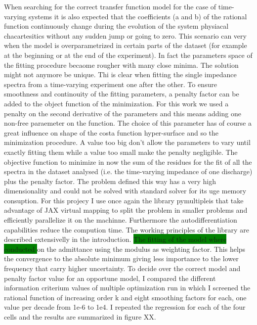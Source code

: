 When searching for the correct transfer function model for the case of time-varying systems it is also expected that the coefficients (a and b) of the rational function continuously change during the evolution of the system physiacal chacartesitics without any sudden jump or going to zero. This scenario can very when the model is overparametrized in certain parts of the dataset (for example at the beginning or at the end of the experiment). In fact the parameters space of the fitting procedure becaome rougher with many close minima. The solution might not anymore be unique. Thi is clear when fitting the single impedance spectra from a time-varying experiment one after the other. To ensure smoothness and continouity of the fitting parameters, a penalty factor can be added to the object function of the minimization.  For this work we used a penalty on the second derivative of the parameters and this means adding one non-free paraemeter on the function. The choice of this parameter has of course a great influence on shape of the costa function hyper-surface and so the minimization procedure. A value too big don’t allow the parameters to vary until exactly fitting them while a value too small make the penalty negligible. The objective function to minimize in now the sum of the residues for the fit of all the spectra in the dataset analysed (i.e. the time-varying impedance of one discharge) plus the penalty factor. The problem defined this way has a very high dimensionality and could not be solved with standard solver for its uge memory consuption. For this projecy I use once again the library pymultipleis that take advantage of JAX virtual mapping to split the problem in smaller problems and efficiently parallelize it on the machinne. Furthermore the autodifferentiation capabilities reduce the compution time. \colorbox{BurntOrange}{The working principles of the library are described extensivelly in the introduction.}
\colorbox{Green}{The fitting of the model where conducted } on the admittance using the modulus as weighting factor. This helps the convergence to the absolute minimum giving less importance to the lower frequency that carry higher uncertainty.
To decide over the correct model and penalty factor value for an opportune model, I compared the different information criterium values of multiple optimization run in which I screened the rational function of increasing order k and eight smoothing factors for each, one value per decade from 1e-6 to 1e4. I repeated the regression for each of the four cells and the results are summarized in figure XX.


